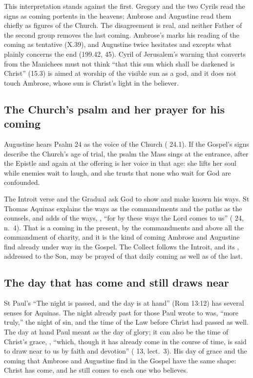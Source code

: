 This interpretation stands against the first. Gregory and the two Cyrils read
the signs as coming portents in the heavens; Ambrose and Augustine read them
chiefly as figures of the Church. The disagreement is real, and neither Father
of the second group removes the last coming. Ambrose's  marks
his reading of the coming as tentative (X.39), and Augustine twice hesitates
and excepts what plainly concerns the end (199.42, 45). Cyril of Jerusalem's warning that
converts from the Manichees must not think ``that this sun which shall be
darkened is Christ'' (15.3) is aimed at worship of the visible sun as a god,
and it does not touch Ambrose, whose sun is Christ's light in the believer.

\subsection{The Church's psalm and her prayer for his coming}

Augustine hears Psalm 24 as the voice of the Church (
24.1). If the Gospel's signs describe the Church's age of trial, the psalm the
Mass sings at the entrance, after the Epistle and again at the offering is her
voice in that age: she lifts her soul while enemies wait to laugh, and she
trusts that none who wait for God are confounded.

The Introit verse and the Gradual ask God to show and make known his ways.
St Thomas Aquinas explains the ways as the commandments and the paths as the
counsels, and adds of the ways, , ``for by these ways the Lord comes to us'' ( 24,
n.~4). That is a coming in the present, by the commandments and above all the
commandment of charity, and it is the
kind of coming Ambrose and Augustine find already under way in the Gospel.
The Collect follows the Introit, and its , addressed to the Son,
may be prayed of that daily coming as well as of the last.

\subsection{The day that has come and still draws near}

St Paul's ``The night is passed, and the day is at hand'' (Rom 13:12) has
several senses for Aquinas. The night already past for those Paul wrote to
was, ``more truly,'' the night of sin, and the time of the Law before Christ
had passed as well. The day at hand Paul meant as the day of glory; it can
also be the time of Christ's grace, , ``which, though it has already come in the course of time, is
said to draw near to us by faith and devotion'' ( 13, lect.~3). His day of grace and the coming that Ambrose and
Augustine find in the Gospel have the same shape: Christ has come, and he
still comes to each one who believes.

